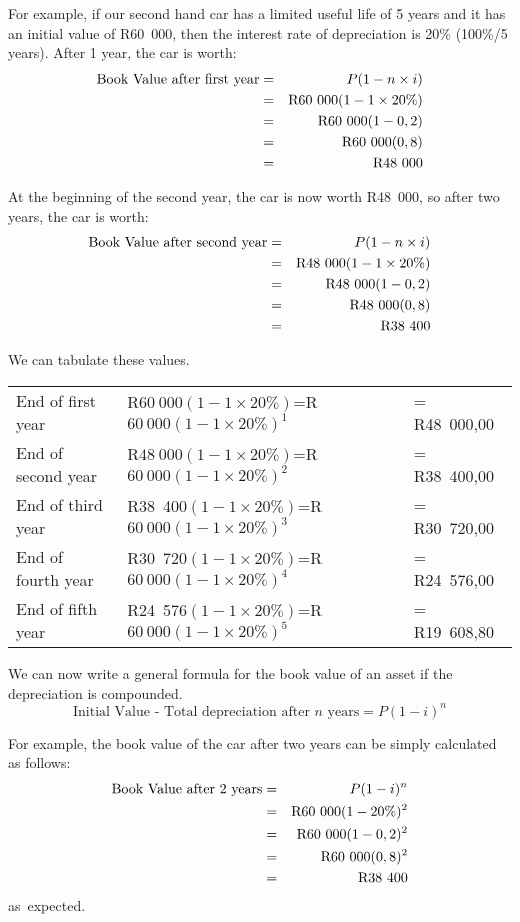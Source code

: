 For example, if our second hand car has a limited useful life of 5 years and it has an initial value of R60~000, then the interest rate of depreciation is 20\% (100\%/5 years). After 1 year, the car is worth:
\begin{eqnarray*}
\mbox{Book Value after first year} &=& P(1-n\times i)\\
&=&\rm{R}60~000(1-1\times 20\%)\\
&=&\rm{R}60~000(1-0,2)\\
&=&\rm{R}60~000(0,8)\\
&=&\rm{R}48~000
\end{eqnarray*}

At the beginning of the second year, the car is now worth R48~000, so after two years, the car is worth:
\begin{eqnarray*}
\mbox{Book Value after second year} &=& P(1-n\times i)\\
&=&\rm{R}48~000(1-1\times 20\%)\\
&=&\rm{R}48~000(1-0,2)\\
&=&\rm{R}48~000(0,8)\\
&=&\rm{R}38~400
\end{eqnarray*}

We can tabulate these values.
\begin{center}
\begin{tabular}{lll}
End of first year & R$60~000(1-1\times20\%)$=R$60~000(1-1\times20\%)^1$ &= R48~000,00\\
End of second year & R$48~000(1-1\times20\%)$=R$60~000(1-1\times20\%)^2$&= R38~400,00\\
End of third year&R38~400$(1-1\times20\%)$=R$60~000(1-1\times20\%)^3$&= R30~720,00\\
End of fourth year&R30~720$(1-1\times20\%)$=R$60~000(1-1\times20\%)^4$&= R24~576,00\\
End of fifth year&R24~576$(1-1\times20\%)$=R$60~000(1-1\times20\%)^5$&= R19~608,80\\
\end{tabular}
\end{center}
We can now write a general formula for the book value of an asset if the depreciation is compounded.
\begin{equation}
\mbox{Initial Value - Total depreciation after $n$ years} = P(1-i)^n
\end{equation}

For example, the book value of the car after two years can be simply calculated as follows:
\begin{eqnarray*}
\mbox{Book Value after 2 years} &=& P(1-i)^n\\
&=&\rm{R}60~000(1-20\%)^2\\
&=&\rm{R}60~000(1-0,2)^2\\
&=&\rm{R}60~000(0,8)^2\\
&=&\rm{R}38~400
\end{eqnarray*}
\mbox{as expected.}

